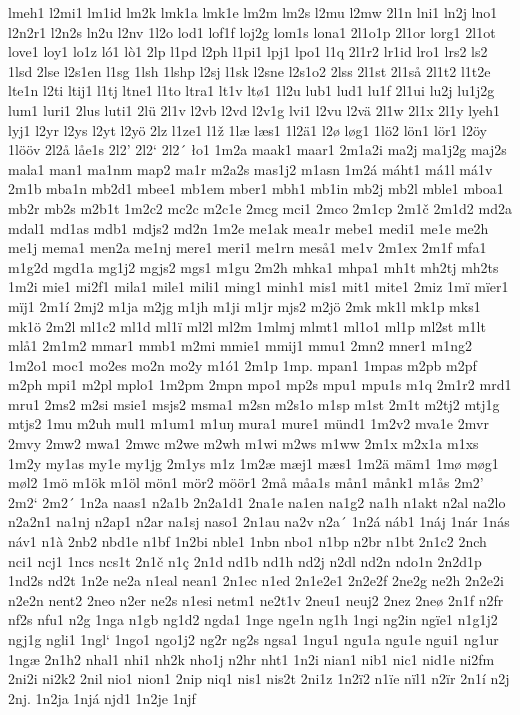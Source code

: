 lmeh1
l2mi1
lm1id
lm2k
lmk1a
lmk1e
lm2m
lm2s
l2mu
l2mw
2l1n
lni1
ln2j
lno1
l2n2r1
l2n2s
ln2u
l2nv
1l2o
lod1
lof1f
loj2g
lom1s
lona1
2l1o1p
2l1or
lorg1
2l1ot
love1
loy1
lo1z
ló1
lò1
2lp
l1pd
l2ph
l1pi1
lpj1
lpo1
l1q
2l1r2
lr1id
lro1
lrs2
ls2
1lsd
2lse
l2s1en
l1sg
1lsh
1lshp
l2sj
l1sk
l2sne
l2s1o2
2lss
2l1st
2l1så
2l1t2
l1t2e
lte1n
l2ti
ltij1
l1tj
ltne1
l1to
ltra1
lt1v
ltø1
1l2u
lub1
lud1
lu1f
2l1ui
lu2j
lu1j2g
lum1
luri1
2lus
luti1
2lü
2l1v
l2vb
l2vd
l2v1g
lvi1
l2vu
l2vä
2l1w
2l1x
2l1y
lyeh1
lyj1
l2yr
l2ys
l2yt
l2yö
2lz
l1ze1
l1ž
1læ
læs1
1l2ä1
l2ø
løg1
1lö2
lön1
lör1
l2öy
1lööv
2l2å
låe1s
2l2'
2l2`
2l2´
ło1
1m2a
maak1
maar1
2m1a2i
ma2j
ma1j2g
maj2s
mala1
man1
ma1nm
map2
ma1r
m2a2s
mas1j2
m1asn
1m2á
máht1
má1l
má1v
2m1b
mba1n
mb2d1
mbee1
mb1em
mber1
mbh1
mb1in
mb2j
mb2l
mble1
mboa1
mb2r
mb2s
m2b1t
1m2c2
mc2c
m2c1e
2mcg
mci1
2mco
2m1cp
2m1č
2m1d2
md2a
mdal1
md1as
mdb1
mdjs2
md2n
1m2e
me1ak
mea1r
mebe1
medi1
me1e
me2h
me1j
mema1
men2a
me1nj
mere1
meri1
me1rn
meså1
me1v
2m1ex
2m1f
mfa1
m1g2d
mgd1a
mg1j2
mgjs2
mgs1
m1gu
2m2h
mhka1
mhpa1
mh1t
mh2tj
mh2ts
1m2i
mie1
mi2f1
mila1
mile1
mili1
ming1
minh1
mis1
mit1
mite1
2miz
1mï
mïer1
mïj1
2m1í
2mj2
m1ja
m2jg
m1jh
m1ji
m1jr
mjs2
m2jö
2mk
mk1l
mk1p
mks1
mk1ö
2m2l
ml1c2
ml1d
ml1ï
ml2l
ml2m
1mlmj
mlmt1
ml1o1
ml1p
ml2st
m1lt
mlå1
2m1m2
mmar1
mmb1
m2mi
mmie1
mmij1
mmu1
2mn2
mner1
m1ng2
1m2o1
moc1
mo2es
mo2n
mo2y
m1ó1
2m1p
1mp.
mpan1
1mpas
m2pb
m2pf
m2ph
mpi1
m2pl
mplo1
1m2pm
2mpn
mpo1
mp2s
mpu1
mpu1s
m1q
2m1r2
mrd1
mru1
2ms2
m2si
msie1
msjs2
msma1
m2sn
m2s1o
m1sp
m1st
2m1t
m2tj2
mtj1g
mtjs2
1mu
m2uh
mul1
m1um1
m1uŋ
mura1
mure1
münd1
1m2v2
mva1e
2mvr
2mvy
2mw2
mwa1
2mwc
m2we
m2wh
m1wi
m2ws
m1ww
2m1x
m2x1a
m1xs
1m2y
my1as
my1e
my1jg
2m1ys
m1z
1m2æ
mæj1
mæs1
1m2ä
mäm1
1mø
møg1
møl2
1mö
m1ök
m1öl
mön1
mör2
möör1
2må
måa1s
mån1
månk1
m1ås
2m2'
2m2`
2m2´
1n2a
naas1
n2a1b
2n2a1d1
2na1e
na1en
na1g2
na1h
n1akt
n2al
na2lo
n2a2n1
na1nj
n2ap1
n2ar
na1sj
naso1
2n1au
na2v
n2a´
1n2á
náb1
1náj
1nár
1nás
náv1
n1à
2nb2
nbd1e
n1bf
1n2bi
nble1
1nbn
nbo1
n1bp
n2br
n1bt
2n1c2
2nch
nci1
ncj1
1ncs
ncs1t
2n1č
n1ç
2n1d
nd1b
nd1h
nd2j
n2dl
nd2n
ndo1n
2n2d1p
1nd2s
nd2t
1n2e
ne2a
n1eal
nean1
2n1ec
n1ed
2n1e2e1
2n2e2f
2ne2g
ne2h
2n2e2i
n2e2n
nent2
2neo
n2er
ne2s
n1esi
netm1
ne2t1v
2neu1
neuj2
2nez
2neø
2n1f
n2fr
nf2s
nfu1
n2g
1nga
n1gb
ng1d2
ngda1
1nge
nge1n
ng1h
1ngi
ng2in
ngïe1
n1g1j2
ngj1g
ngli1
1ngl`
1ngo1
ngo1j2
ng2r
ng2s
ngsa1
1ngu1
ngu1a
ngu1e
ngui1
ng1ur
1ngæ
2n1h2
nhal1
nhi1
nh2k
nho1j
n2hr
nht1
1n2i
nian1
nib1
nic1
nid1e
ni2fm
2ni2i
ni2k2
2nil
nio1
nion1
2nip
niq1
nis1
nis2t
2ni1z
1n2ï2
n1ïe
nïl1
n2ïr
2n1í
n2j
2nj.
1n2ja
1njá
njd1
1n2je
1njf

